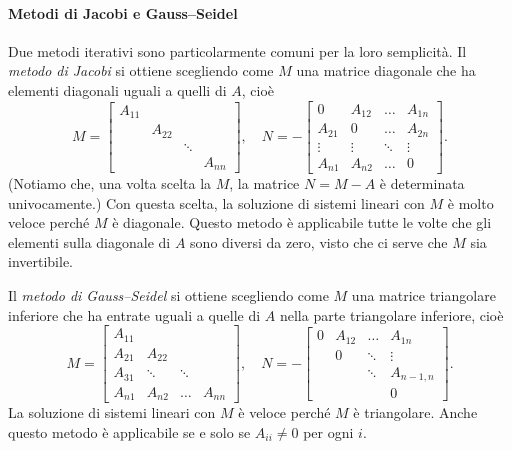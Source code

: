 \documentclass[a4paper]{report}
\theoremstyle{definition}
\theoremstyle{remark}
\begin{document}
\paragraph{Metodi di Jacobi e Gauss--Seidel} Due metodi iterativi sono particolarmente comuni per la loro semplicità. Il \emph{metodo di Jacobi} si ottiene scegliendo come $M$ una matrice diagonale che ha elementi diagonali uguali a quelli di $A$, cioè
\[
M = \begin{bmatrix}
    A_{11}\\
    & A_{22}\\
    & & \ddots \\
    & & & A_{nn}
\end{bmatrix}, \quad N = -\begin{bmatrix}
    0 & A_{12} & \dots & A_{1n}\\
    A_{21} & 0 & \dots & A_{2n}\\
    \vdots & \vdots & \ddots & \vdots\\
    A_{n1} & A_{n2} & \dots & 0
\end{bmatrix}.
\]
(Notiamo che, una volta scelta la $M$, la matrice $N = M-A$ è determinata univocamente.) Con questa scelta, la soluzione di sistemi lineari con $M$ è molto veloce perché $M$ è diagonale. Questo metodo è applicabile tutte le volte che gli elementi sulla diagonale di $A$ sono diversi da zero, visto che ci serve che $M$ sia invertibile.

Il \emph{metodo di Gauss--Seidel} si ottiene scegliendo come $M$ una matrice triangolare inferiore che ha entrate uguali a quelle di $A$ nella parte triangolare inferiore, cioè
\[
M = \begin{bmatrix}
    A_{11}\\
    A_{21} & A_{22}\\
    A_{31}& \ddots & \ddots \\
    A_{n1}& A_{n2} &\dots & A_{nn}
\end{bmatrix}
, \quad N =-\begin{bmatrix}
    0& A_{12} & \dots & A_{1n}\\
    & 0 & \ddots & \vdots\\
    &  & \ddots & A_{n-1,n}\\
    & &  & 0
\end{bmatrix}.
\]
La soluzione di sistemi lineari con $M$ è veloce perché $M$ è triangolare. Anche questo metodo è applicabile se e solo se $A_{ii} \neq 0$ per ogni $i$. 
\end{document}
